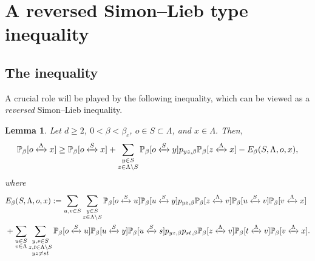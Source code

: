 \documentclass[11pt,a4paper]{article}
\numberwithin{equation}{section}
\theoremstyle{plain}
\newtheorem{Lem}[Thm]{Lemma}
\theoremstyle{definition}
\newcommand{\connect}{\xleftrightarrow}
\begin{document}
\section{A reversed Simon--Lieb type inequality}\label{sec:2}

\subsection{The inequality}

A crucial role will be played by the following inequality, which can be viewed as a \emph{reversed} Simon--Lieb inequality. 

\begin{Lem}\label{Lem: SL lower bound} Let $d\geq 2$, $0<\beta<\beta_c$, $o\in S\subset \Lambda$, and $x\in \Lambda$. Then,
\begin{equation}\label{eq:reversed SL perco}
\mathbb P_{\beta}[o\connect{\Lambda\:}x]\ge \mathbb P_{\beta}[o\connect{S\:}x]+\sum_{\substack{y\in S\\ z\in \Lambda\setminus S}}\mathbb P_{\beta}[o\connect{S\:}y]p_{yz,\beta} \mathbb P_{\beta}[z\connect{\Lambda\:}x]-E_\beta(S,\Lambda,o,x),
\end{equation}
where
\begin{align}\label{eq:error first term}
&E_\beta (S,\Lambda,o,x)
:=\sum_{u,v\in S}\sum_{\substack{y \in S\\ z\in\Lambda\setminus S}}\mathbb P_{\beta}[o\connect{S\:}u]\mathbb P_{\beta}[u\connect{S\:}y]p_{yz,\beta}\mathbb P_{\beta}[z\connect{\Lambda\:}v]\mathbb P_{\beta}[u\connect{S\:}v]\mathbb P_\beta[v\connect{\Lambda\:}x]
\\\label{eq:error second term}
&+\sum_{\substack{u\in S\\ v\in \Lambda}}\sum_{\substack{y,s\in S\\ z,t\in \Lambda\setminus S\\ yz\neq st}}\mathbb P_\beta[o\connect{S\:}u]\mathbb P_\beta[u\connect{S\:}y]\mathbb P_\beta[u\connect{S\:}s]p_{yz,\beta}p_{st,\beta}\mathbb P_\beta[z\connect{\Lambda\:}v]\mathbb P_\beta[t\connect{\Lambda\:}v]\mathbb P_\beta[v\connect{\Lambda\:}x].
\end{align}
\end{Lem}
\end{document}
